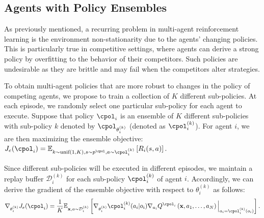\subsection{Agents with Policy Ensembles}
\label{sec:ensemble}
As previously mentioned, a recurring problem in multi-agent reinforcement learning is the environment non-stationarity due to the agents' changing policies. This is particularly true in competitive settings, where agents can derive a strong policy by overfitting to the behavior of their competitors. Such policies are undesirable as they are brittle and may fail when the competitors alter strategies.


To obtain multi-agent policies that are more robust to changes in the policy of competing agents, we propose to train a collection of $K$ different sub-policies. At each episode, we randomly select one particular sub-policy for each agent to execute. 
Suppose that policy $\cpol_i$ is an ensemble of $K$ different sub-policies with sub-policy $k$ denoted by $\cpol_{\theta_i^{(k)}}$ (denoted as $\cpol_i^{(k)}$). For agent $i$, we are then maximizing the ensemble objective:
$
J_e(\cpol_i)=\mathbb{E}_{k\sim\textrm{unif}(1,K),s\sim p^{\cpol},a\sim\cpol_i^{(k)}}\left[R_i(s,a)\right].
$

Since different sub-policies will be executed in different episodes, we maintain a replay buffer $\mathcal{D}_i^{(k)}$ for each sub-policy $\cpol_i^{(k)}$ of agent $i$. Accordingly, we can derive the gradient of the ensemble objective with respect to $\theta_i^{(k)}$ as follows:
\begin{equation}\label{eq:J_ensemble_grad}
\nabla_{\theta_i^{(k)}} J_e(\cpol_i)=\frac{1}{K}\mathbb{E}_{\mathbf{x},a\sim \mathcal{D}_i^{(k)}}\left[\nabla_{\theta_i^{(k)}} \cpol_i^{(k)}(a_i|o_i)\nabla_{a_i}Q^{\cpol_i}\left(\mathbf{x},a_1,\ldots,a_N\right)\Big|_{a_i=\cpol_i^{(k)}(o_i)}\right].
\end{equation}

